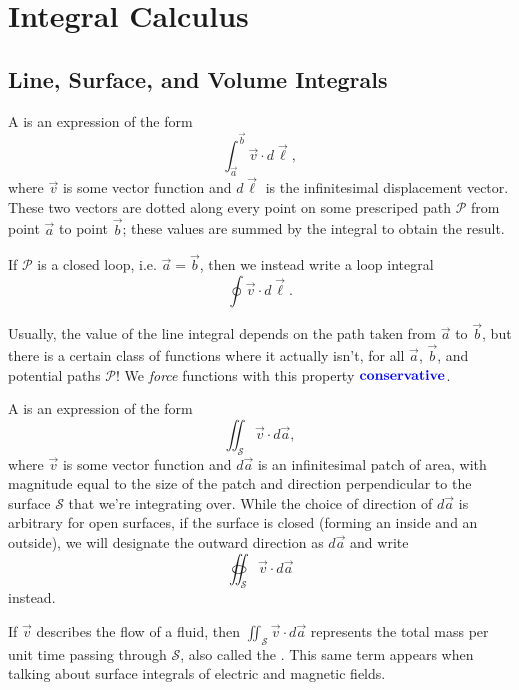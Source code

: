 \section{Integral Calculus}

\subsection{Line, Surface, and Volume Integrals}

\begin{definition}
    A  is an expression of the form 
    \[\int_{\vec{a}}^{\vec{b}}\vec{v}\cdot d\vec{\ell},\]
    where $\vec{v}$ is some vector function and $d\vec{\ell}$ is the infinitesimal displacement vector.
    These two vectors are dotted along every point on some prescriped path $\mathcal{P}$ from point $\vec{a}$ to point $\vec{b}$;
    these values are summed by the integral to obtain the result.

    If $\mathcal{P}$ is a closed loop, i.e. $\vec{a}=\vec{b}$, then we instead write a loop integral
    \[\oint\vec{v}\cdot d\vec{\ell}.\]
\end{definition}

Usually, the value of the line integral depends on the path taken from $\vec{a}$ to $\vec{b}$,
but there is a certain class of functions where it actually isn't, for all $\vec{a}$, $\vec{b}$, and potential paths $\mathcal{P}$!
We \textit{force} functions with this property $\textbf{\color{blue} conservative}$.

\begin{definition}
    A  is an expression of the form
    \[\iint_{\mathcal{S}}\vec{v}\cdot d\vec{a},\]
    where $\vec{v}$ is some vector function and $d\vec{a}$ is an infinitesimal patch of area, 
    with magnitude equal to the size of the patch and direction perpendicular to the surface $\mathcal{S}$
    that we're integrating over. While the choice of direction of $d\vec{a}$ is arbitrary for open surfaces,
    if the surface is closed (forming an inside and an outside), we will designate the outward direction as $d\vec{a}$
    and write
    \[\oiint_{\mathcal{S}}\vec{v}\cdot d\vec{a}\]
    instead.
\end{definition}

If $\vec{v}$ describes the flow of a fluid, then $\iint_\mathcal{S}\vec{v}\cdot d\vec{a}$ represents the total mass per unit time 
passing through $\mathcal{S}$, also called the . This same term appears when talking about surface integrals of electric and magnetic fields.


